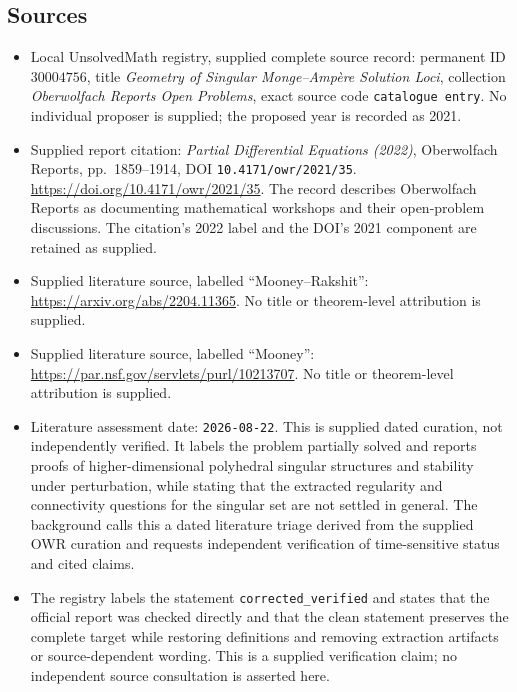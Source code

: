 \documentclass[11pt]{article}
\begin{document}
\subsection{Sources}
\begin{itemize}
\item Local UnsolvedMath registry, supplied complete source record: permanent ID \(30004756\), title \emph{Geometry of Singular Monge--Amp\`ere Solution Loci}, collection \emph{Oberwolfach Reports Open Problems}, exact source code \texttt{catalogue entry}. No individual proposer is supplied; the proposed year is recorded as 2021.
\item Supplied report citation: \emph{Partial Differential Equations (2022)}, Oberwolfach Reports, pp.\ 1859--1914, DOI \texttt{10.4171/owr/2021/35}. \url{https://doi.org/10.4171/owr/2021/35}. The record describes Oberwolfach Reports as documenting mathematical workshops and their open-problem discussions. The citation's 2022 label and the DOI's 2021 component are retained as supplied.
\item Supplied literature source, labelled ``Mooney--Rakshit'': \url{https://arxiv.org/abs/2204.11365}. No title or theorem-level attribution is supplied.
\item Supplied literature source, labelled ``Mooney'': \url{https://par.nsf.gov/servlets/purl/10213707}. No title or theorem-level attribution is supplied.
\item Literature assessment date: \texttt{2026-08-22}. This is supplied dated curation, not independently verified. It labels the problem partially solved and reports proofs of higher-dimensional polyhedral singular structures and stability under perturbation, while stating that the extracted regularity and connectivity questions for the singular set are not settled in general. The background calls this a dated literature triage derived from the supplied OWR curation and requests independent verification of time-sensitive status and cited claims.
\item The registry labels the statement \texttt{corrected\_verified} and states that the official report was checked directly and that the clean statement preserves the complete target while restoring definitions and removing extraction artifacts or source-dependent wording. This is a supplied verification claim; no independent source consultation is asserted here.
\end{itemize}
\end{document}
